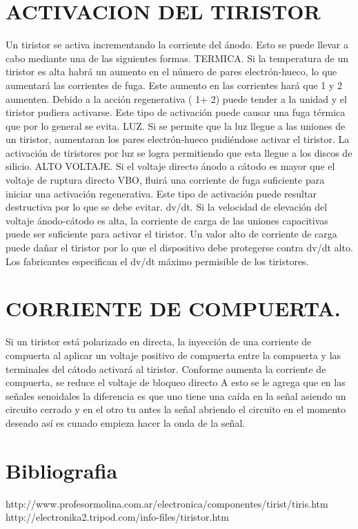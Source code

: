 \documentclass[11pt,a4paper]{article}
\begin{document}
\section{ACTIVACION DEL TIRISTOR}
Un tiristor se activa incrementando la corriente del ánodo. Esto se puede llevar a cabo  mediante una de las siguientes formas.
TERMICA.   Si la temperatura de un tiristor es alta habrá un aumento en el número de pares electrón-hueco, lo que aumentará las corrientes de fuga. Este aumento en las corrientes hará que 1 y 2  aumenten. Debido a la acción regenerativa (   1+   2) puede tender a la unidad y el tiristor pudiera activarse. Este tipo de activación puede causar una fuga térmica que por lo general se evita.
LUZ.   Si se permite que la luz llegue a las uniones de un tiristor, aumentaran los pares electrón-hueco pudiéndose activar el  tiristor. La activación de tiristores por luz se logra permitiendo que esta llegue a los discos de silicio.
ALTO VOLTAJE.  Si el voltaje directo ánodo  a cátodo es mayor que el voltaje de ruptura directo VBO, fluirá una corriente de fuga suficiente para iniciar una activación regenerativa. Este tipo de activación puede resultar destructiva por lo que se debe evitar.
dv/dt.     Si la velocidad de elevación del voltaje ánodo-cátodo es alta, la corriente de carga de las uniones capacitivas puede ser suficiente para activar el tiristor. Un valor alto de corriente de carga puede dañar el tiristor por lo que el dispositivo debe protegerse contra dv/dt alto. Los fabricantes especifican el dv/dt máximo permisible de los tiristores.
\section{CORRIENTE DE COMPUERTA.}
 Si un tiristor está polarizado en directa, la inyección de una corriente de compuerta al aplicar un voltaje positivo de compuerta entre la compuerta y las terminales del cátodo activará al tiristor. Conforme aumenta la corriente de compuerta, se reduce el voltaje de bloqueo directo
A esto se le agrega que en las señales senoidales la diferencia es que uno tiene una caída en la señal asiendo un circuito cerrado y en el otro tu antes la señal abriendo el circuito en el momento deseado así es cunado empieza hacer la onda de la señal.\\

\section{Bibliografia}
http://www.profesormolina.com.ar/electronica/componentes/tirist/tiris.htm
http://electronika2.tripod.com/info-files/tiristor.htm
\end{document}
